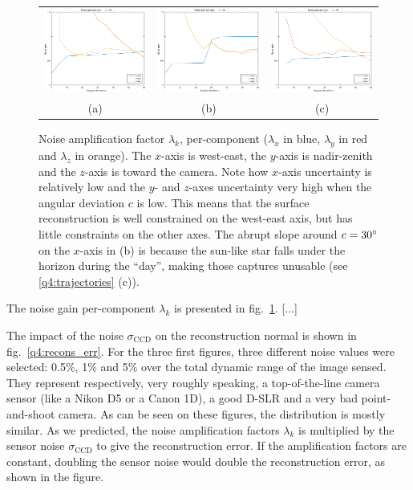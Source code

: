 \documentclass{report}
\begin{document}
\begin{figure}
  \centering
  \begin{tabular}{ccc}
  \includegraphics[width=0.30\linewidth]{q4_noise_10.pdf} &
  \includegraphics[width=0.30\linewidth]{q4_noise_45.pdf} &
  \includegraphics[width=0.30\linewidth]{q4_noise_75.pdf} \\
  (a) &
  (b) &
  (c)
  \end{tabular}
  \caption[Per-component noise amplification factor]
   {Noise amplification factor $\lambda_k$, per-component ($\lambda_x$ in blue, $\lambda_y$ in red and $\lambda_z$ in orange). The $x$-axis is west-east, the $y$-axis is nadir-zenith and the $z$-axis is toward the camera. Note how $x$-axis uncertainty is relatively low and the $y$- and $z$-axes uncertainty very high when the angular deviation $c$ is low. This means that the surface reconstruction is well constrained on the west-east axis, but has little constraints on the other axes. The abrupt slope around $c = 30\degree$ on the $x$-axis in (b) is because the sun-like star falls under the horizon during the ``day'', making those captures unusable (see \ref{q4:trajectories} (c)).}
  \label{q4:lambda}
\end{figure}

The noise gain per-component $\lambda_k$ is presented in fig.~\ref{q4:lambda}. [...]

The impact of the noise $\sigma_\text{CCD}$ on the reconstruction normal is shown in fig.~\ref{q4:recons_err}. For the three first figures, three different noise values were selected: 0.5\%, 1\% and 5\% over the total dynamic range of the image sensed. They represent respectively, very roughly speaking, a top-of-the-line camera sensor (like a Nikon D5 or a Canon 1D), a good D-SLR and a very bad point-and-shoot camera. As can be seen on these figures, the distribution is mostly similar. As we predicted, the noise amplification factors $\lambda_k$ is multiplied by the sensor noise $\sigma_\text{CCD}$ to give the reconstruction error. If the amplification factors are constant, doubling the sensor noise would double the reconstruction error, as shown in the figure.
\end{document}
